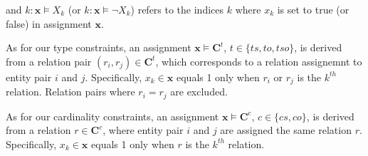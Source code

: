 and $k\colon\bm x \models X_k$ (or $k\colon\bm x\models \neg X_k$) refers to the indices $k$ where $x_k$ is set to true (or false) in assignment $\bm x$.

As for our type constraints, an assignment $\bm x \models \bm{C}^t$, $t\in\{ts,to,tso\}$, is derived from a relation pair $(r_i, r_j) \in \bm{C}^{t}$, which corresponds to a relation assignemnt to entity pair $i$ and $j$.
Specifically, $x_k\in \bm{x}$ equals 1 only when $r_i$ or $r_j$ is the $k^{th}$ relation.
Relation pairs where $r_i=r_j$ are excluded.

As for our cardinality constraints, an assignment $\bm x \models \bm{C}^c$, $c\in\{cs,co\}$, is derived from a relation $r \in \bm{C}^{c}$, where entity pair $i$ and $j$ are assigned the same relation $r$.
Specifically, $x_k\in \bm{x}$ equals 1 only when $r$ is the $k^{th}$ relation.

